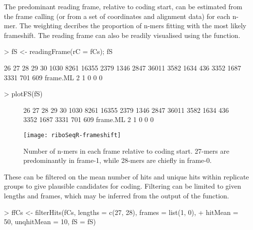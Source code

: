 \documentclass[a4paper]{article}
\begin{document}
The predominant reading frame, relative to coding start, can be estimated from the frame calling (or from a set of coordinates and alignment data) for each n-mer. The weighting decribes the proportion of n-mers fitting with the most likely frameshift. The reading frame can also be readily visualised using the  function.

\begin{Schunk}
\begin{Sinput}
> fS <- readingFrame(rC = fCs); fS
\end{Sinput}
\begin{Soutput}
           26    27    28   29   30
         1030  8261 16355 2379 1346
         2847 36011  3582 1634  436
         3352  1687  3331  701  609
frame.ML    2     1     0    0    0
\end{Soutput}
\begin{Sinput}
> plotFS(fS)
\end{Sinput}
\end{Schunk}

\begin{figure}[!ht]
\begin{center}
\begin{Schunk}
\begin{Soutput}
           26    27    28   29   30
         1030  8261 16355 2379 1346
         2847 36011  3582 1634  436
         3352  1687  3331  701  609
frame.ML    2     1     0    0    0
\end{Soutput}
\end{Schunk}
\texttt{[image: riboSeqR-frameshift]}
\caption{Number of n-mers in each frame relative to coding start. 27-mers are predominantly in frame-1, while 28-mers are chiefly in frame-0.}
\label{fig:frameshift}
\end{center}
\end{figure}


These can be filtered on the mean number of hits and unique hits within replicate groups to give plausible candidates for coding. Filtering can be limited to given lengths and frames, which may be inferred from the output of the  function.

\begin{Schunk}
\begin{Sinput}
> ffCs <- filterHits(fCs, lengths = c(27, 28), frames = list(1, 0), 
+                    hitMean = 50, unqhitMean = 10, fS = fS)
\end{Sinput}
\end{Schunk}
\end{document}
